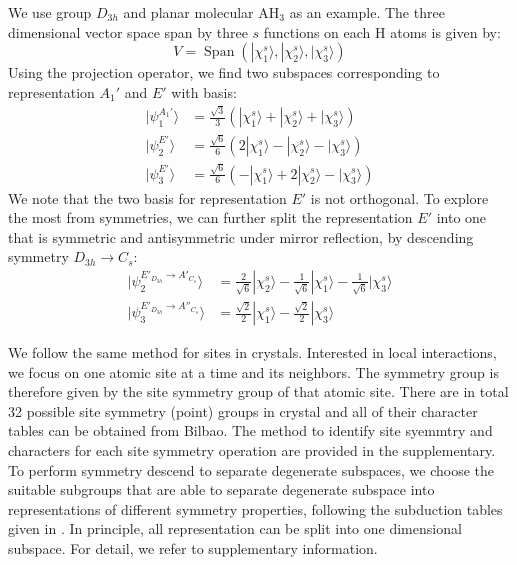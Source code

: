 \documentclass{article}
\DeclareMathOperator{\spn}{Span}
\begin{document}
We use group $D_{3h}$ and planar molecular AH$_3$ as an example. The 
three dimensional vector space span by three $s$ functions on each H atoms
is given by:
\begin{equation}
    V = \spn(|\chi^s_{1}\rangle, |\chi^s_2\rangle, |\chi^s_3\rangle)
\end{equation}
Using the projection operator, we find two subspaces corresponding to representation $A_1'$ 
and $E'$ with basis:
\begin{align}
    | \psi_1^{A_1'} \rangle &= \frac{\sqrt{3}}{3} (|\chi^s_1\rangle + |\chi^s_2\rangle + |\chi^s_3\rangle) \\
    |\psi_2^{E'}\rangle   &= \frac{\sqrt{6}}{6}( 2|\chi^s_1\rangle - |\chi^s_2\rangle - |\chi^s_3\rangle) \\
    |\psi_3^{E'}\rangle   &= \frac{\sqrt{6}}{6}(- |\chi^s_1\rangle + 2|\chi^s_2\rangle - |\chi^s_3\rangle)
\end{align}
We note that the two basis for representation $E'$ is not orthogonal.
To explore the most from symmetries, we can further split the representation $E'$ into one
that is symmetric and antisymmetric under mirror reflection, by descending symmetry $D_{3h}\to C_s$:
\begin{align}
    |\psi_2^{E'_{D_{3h}}\to A'_{C_s}} \rangle &= \frac{2}{\sqrt{6}} |\chi^s_2\rangle - \frac{1}{\sqrt{6}} |\chi^s_1\rangle - \frac{1}{\sqrt{6}} |\chi^s_3\rangle \\
    |\psi_3^{E'_{D_{3h}}\to A''_{C_s}}\rangle &= \frac{\sqrt{2}}{2} |\chi^s_1\rangle - \frac{\sqrt{2}}{2} |\chi^s_3\rangle
\end{align}

We follow the same method for sites in crystals. Interested in local interactions, we focus on one atomic site at a time and its neighbors. 
The symmetry group is therefore given by the site symmetry group of that atomic site. 
There are in total 32 possible site symmetry (point) groups in crystal and all of their character tables can be obtained from Bilbao. 
The method to identify site syemmtry and characters for each site symmetry operation are provided in the supplementary. 
To perform symmetry descend to separate degenerate subspaces, we choose the suitable subgroups that are able to separate degenerate 
subspace into representations of different symmetry properties, following the subduction tables 
given in \cite{altmann_point-group_1994}. In principle, all representation can be split into one dimensional subspace. 
For detail, we refer to supplementary information.
\end{document}
